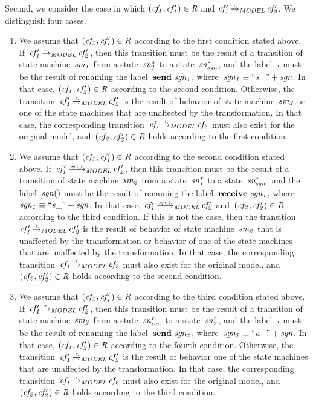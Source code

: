 \noindent
Second, we consider the case in which $(\it{cf_1}, \it{cf_1'})\in R$ and $\it{cf_1'} \TextModelRelation{l} \it{cf_2'}$.
We distinguish four cases.
\begin{enumerate}
\item
We assume that $(\it{cf_1}, \it{cf_1'})\in R$ according to the first condition stated above.
If~$\it{cf_1'} \TextModelRelation{\tau} \it{cf_2'}$, then this transition must be the result of a transition of state machine~$\it{sm_1}$ from a state~$\it{sn^s_1}$ to a state~$\it{sn^s_{sgn}}$, and the label~$\tau$ must be the result of renaming the label~$\textbf{send}\ \it{sgn_1}$, where~$\it{sgn_1} \equiv ``s\_" + \it{sgn}$.
In that case, $(\it{cf_1}, \it{cf_2'})\in R$ according to the second condition.
Otherwise, the transition~$\it{cf_1'} \TextModelRelation{\it{l}} \it{cf_2'}$ is the result of behavior of state machine~$\it{sm_2}$ or one of the state machines that are unaffected by the transformation.
In that case, the corresponding transition~$\it{cf_1} \TextModelRelation{l} \it{cf_2}$ must also exist for the original model, and~$(\it{cf_2}, \it{cf_2'})\in R$ holds according to the first condition.

\item
We assume that $(\it{cf_1}, \it{cf_1'})\in R$ according to the second condition stated above.
If~$\it{cf_1'} \TextModelRelation{\it{sgn}()} \it{cf_2'}$, then this transition must be the result of a transition of state machine~$\it{sm_2}$ from a state~$\it{sn^r_1}$ to a state~$\it{sn^r_{sgn}}$, and the label~$\it{sgn}()$ must be the result of renaming the label~$\textbf{receive}\ \it{sgn_1}$, where~$\it{sgn_1} \equiv ``s\_" + \it{sgn}$.
In that case, $\it{cf_1'} \TextModelRelation{\it{sgn}()} \it{cf_2'}$ and~$(\it{cf_2}, \it{cf_2'})\in R$ according to the third condition.
If this is not the case, then the transition~$\it{cf_1'} \TextModelRelation{\it{l}} \it{cf_2'}$ is the result of behavior of state machine~$\it{sm_2}$ that is unaffected by the transformation or behavior of one of the state machines that are unaffected by the transformation.
In that case, the corresponding transition~$\it{cf_1} \TextModelRelation{l} \it{cf_2}$ must also exist for the original model, and~$(\it{cf_2}, \it{cf_2'})\in R$ holds according to the second condition.

\item
We assume that $(\it{cf_1}, \it{cf_1'})\in R$ according to the third condition stated above.
If~$\it{cf_1'} \TextModelRelation{\tau} \it{cf_2'}$, then this transition must be the result of a transition of state machine~$\it{sm_2}$ from a state~$\it{sn^r_{sgn}}$ to a state~$\it{sn^r_2}$, and the label~$\tau$ must be the result of renaming the label~$\textbf{send}\ \it{sgn_2}$, where~$\it{sgn_2} \equiv ``a\_" + \it{sgn}$.
In that case, $(\it{cf_1}, \it{cf_2'})\in R$ according to the fourth condition.
Otherwise, the transition~$\it{cf_1'} \TextModelRelation{\it{l}} \it{cf_2'}$ is the result of behavior one of the state machines that are unaffected by the transformation.
In that case, the corresponding transition~$\it{cf_1} \TextModelRelation{l} \it{cf_2}$ must also exist for the original model, and~$(\it{cf_2}, \it{cf_2'})\in R$ holds according to the third condition.


\end{enumerate}
